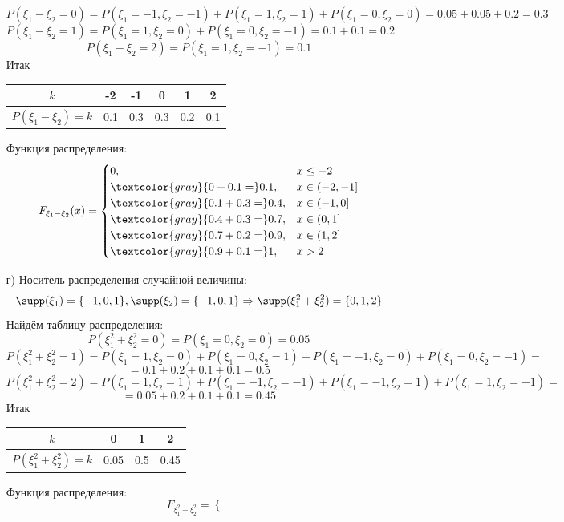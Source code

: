 \begin{enumerate}
	\[ P(\xi_1 - \xi_2 = 0) = P(\xi_1 = -1, \xi_2 = -1) + P(\xi_1 = 1, \xi_2 = 1) + P(\xi_1 = 0, \xi_2 = 0) = 0.05 + 0.05 + 0.2 = 0.3 \]
	\[ P(\xi_1 - \xi_2 = 1) = P(\xi_1 = 1, \xi_2 = 0) + P(\xi_1 = 0, \xi_2 = -1) = 0.1 + 0.1 = 0.2 \]
	\[ P(\xi_1 - \xi_2 = 2) = P(\xi_1 = 1, \xi_2 = -1) = 0.1 \]
	Итак
	\begin{table}[H]
		\centering
		\begin{tabular}{|c|c|c|c|c|c|}
			\hline
			$k$                	   & -2  & -1  & 0   & 1   & 2   \\ \hline
			$P(\xi_1 - \xi_2) = k$ & 0.1 & 0.3 & 0.3 & 0.2 & 0.1 \\ \hline
		\end{tabular}
	\end{table}
	Функция распределения:
	\[
	F_{\xi_1 - \xi_2}(x) =
	\begin{cases}
		0, & x \le -2 \\
		\textcolor{gray}{0+0.1=}0.1, &x \in (-2, -1] \\
		\textcolor{gray}{0.1+0.3=}0.4, &x \in (-1, 0] \\
		\textcolor{gray}{0.4+0.3=}0.7, &x \in (0, 1] \\
		\textcolor{gray}{0.7+0.2=}0.9, &x \in (1, 2] \\
		\textcolor{gray}{0.9+0.1=}1, &x > 2
	\end{cases}
	\]
	\item[г)]
	Носитель распределения случайной величины:
	\[ \supp(\xi_1) = \{ -1, 0, 1 \}, \supp(\xi_2) = \{ -1, 0, 1 \} \Rightarrow \supp(\xi_1^2 + \xi_2^2) = \{ 0, 1, 2 \} \]
	Найдём таблицу распределения:
	\[ P(\xi_1^2 + \xi_2^2 = 0) = P(\xi_1 = 0, \xi_2 = 0) = 0.05 \]
	\[ P(\xi_1^2 + \xi_2^2 = 1) = P(\xi_1 = 1, \xi_2 = 0) + P(\xi_1 = 0, \xi_2 = 1) + P(\xi_1 = -1, \xi_2 = 0) + P(\xi_1 = 0, \xi_2 = -1) = \]
	\[= 0.1 + 0.2 + 0.1 + 0.1 = 0.5 \]
	\[ P(\xi_1^2 + \xi_2^2 = 2) = P(\xi_1 = 1, \xi_2 = 1) + P(\xi_1 = -1, \xi_2 = -1) + P(\xi_1 = -1, \xi_2 = 1) + P(\xi_1 = 1, \xi_2 = -1) = \]
	\[= 0.05 + 0.2 + 0.1 + 0.1 = 0.45 \]
	Итак
	\begin{table}[H]
		\centering
		\begin{tabular}{|c|c|c|c|}
			\hline
			$k$                        & 0    & 1   & 2    \\ \hline
			$P(\xi_1^2 + \xi_2^2) = k$ & 0.05 & 0.5 & 0.45 \\ \hline
		\end{tabular}
	\end{table}
	Функция распределения:
	\[
	F_{\xi_1^2 + \xi_2^2} =
	\begin{cases}

\end{cases}\]
\end{enumerate}
